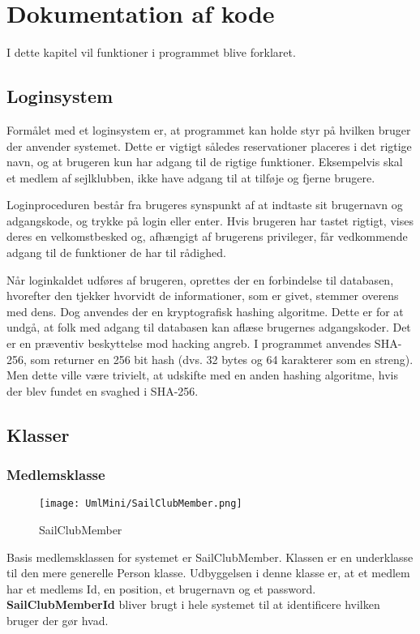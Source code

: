 \chapter{Dokumentation af kode} \label{chap:kode_docs}
I dette kapitel vil funktioner i programmet blive forklaret.

\section{Loginsystem} \label{sec:login}
Formålet med et loginsystem er, at programmet kan holde styr på hvilken bruger der anvender systemet. 
Dette er vigtigt således reservationer placeres i det rigtige navn, og at brugeren kun har adgang til de rigtige funktioner. 
Eksempelvis skal et medlem af sejlklubben, ikke have adgang til at tilføje og fjerne brugere. 

Loginproceduren består fra brugeres synspunkt af at indtaste sit brugernavn og adgangskode, og trykke på login eller enter. 
Hvis brugeren har tastet rigtigt, vises deres en velkomstbesked og, afhængigt af brugerens privileger, får vedkommende adgang til de funktioner de har til rådighed.

Når loginkaldet udføres af brugeren, oprettes der en forbindelse til databasen, hvorefter den tjekker hvorvidt de informationer, som er givet, stemmer overens med dens. 
Dog anvendes der en kryptografisk hashing algoritme. Dette er for at undgå, at folk med adgang til databasen kan aflæse brugernes adgangskoder.
Det er en præventiv beskyttelse mod hacking angreb.
I programmet anvendes SHA-256, som returner en 256 bit hash (dvs. 32 bytes og 64 karakterer som en streng). 
Men dette ville være trivielt, at udskifte med en anden hashing algoritme, hvis der blev fundet en svaghed i SHA-256. 


\section{Klasser}
\subsection*{Medlemsklasse}
\begin{wrapfigure}{l}{0.5\textwidth}
    \label{img:SailClubMember}
    \vspace{-20pt}
    \begin{center}
        \texttt{[image: UmlMini/SailClubMember.png]}
    \end{center}
    \vspace{-20pt}
    \caption{SailClubMember}
    \vspace{-10pt}
\end{wrapfigure}
Basis medlemsklassen for systemet er SailClubMember. 
Klassen er en underklasse til den mere generelle Person klasse. 
Udbyggelsen i denne klasse er, at et medlem har et medlems Id, en position, et brugernavn og et password. 
\textbf{SailClubMemberId} bliver brugt i hele systemet til at identificere hvilken bruger der gør hvad. 

